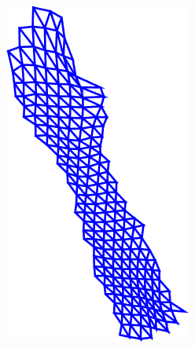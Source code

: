 \begin{figure}[t!]
\begin{subfigure}[b]{0.1\textwidth}
            \includegraphics[width=\textwidth]{resources/Fig_Flows/5}
    \end{subfigure}
    \\
    \begin{subfigure}[b]{0.1\textwidth}

\end{subfigure}
\end{figure}

